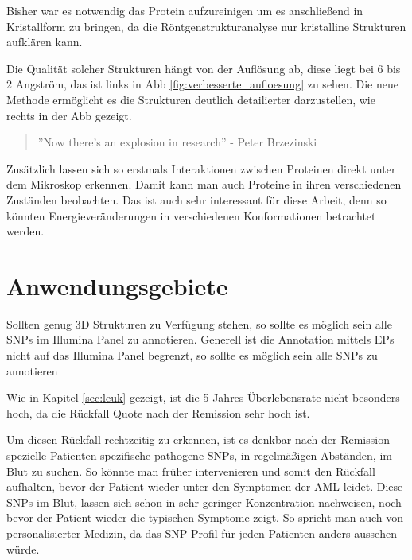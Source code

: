 Bisher war es notwendig das Protein aufzureinigen um es anschließend in Kristallform zu bringen, da die Röntgenstrukturanalyse nur kristalline Strukturen aufklären kann. 

Die Qualität solcher Strukturen hängt von der Auflösung ab, diese liegt bei 6 bis 2 Angström, das ist links in \ac{Abb} \ref{fig:verbesserte_aufloesung} zu sehen. Die neue Methode ermöglicht es die Strukturen deutlich detailierter darzustellen, wie rechts in der \ac{Abb} gezeigt.

\begin{quote}
    ''Now there's an explosion in research''
    - Peter Brzezinski
\end{quote}

Zusätzlich lassen sich so erstmals Interaktionen zwischen Proteinen direkt unter dem Mikroskop erkennen. Damit kann man auch Proteine in ihren verschiedenen Zuständen beobachten. Das ist auch sehr interessant für diese Arbeit, denn so könnten Energieveränderungen in verschiedenen Konformationen betrachtet werden.





\section{Anwendungsgebiete}

Sollten genug 3D Strukturen zu Verfügung stehen, so sollte es möglich sein alle \ac{SNP}s im Illumina Panel zu annotieren. Generell ist die Annotation mittels \ac{EP}s nicht auf das Illumina Panel begrenzt, so sollte es möglich sein alle \ac{SNP}s zu annotieren

Wie in Kapitel \ref{sec:leuk} gezeigt, ist die 5 Jahres Überlebensrate nicht besonders hoch, da die Rückfall Quote nach der Remission sehr hoch ist. 

Um diesen Rückfall rechtzeitig zu erkennen, ist es denkbar nach der Remission spezielle Patienten spezifische pathogene \ac{SNP}s, in regelmäßigen Abständen, im Blut zu suchen. So könnte man früher intervenieren und somit den Rückfall aufhalten, bevor der Patient wieder unter den Symptomen der \ac{AML} leidet.
Diese \ac{SNP}s im Blut, lassen sich schon in sehr geringer Konzentration nachweisen, noch bevor der Patient wieder die typischen Symptome zeigt. So spricht man auch von personalisierter Medizin, da das \ac{SNP} Profil für jeden Patienten anders aussehen würde.




